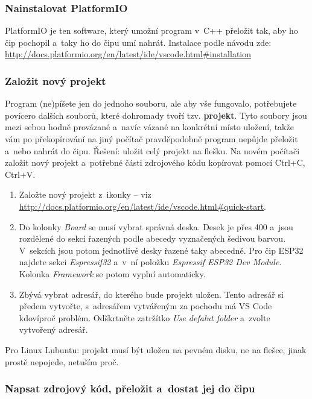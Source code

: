 \subsubsection{Nainstalovat PlatformIO} \label{platformio}

 PlatformIO je ten software, který umožní program v~C++ 
přeložit tak, aby ho čip pochopil a~taky ho do čipu umí nahrát. 
Instalace podle návodu zde: \url{http://docs.platformio.org/en/latest/ide/vscode.html\#installation}

\label{vsc:newproject} \subsubsection{Založit nový projekt}

Program (ne)píšete jen do jednoho souboru, ale aby vše fungovalo, potřebujete povícero dalších souborů, které dohromady tvoří tzv. {\bf projekt}.
Tyto soubory jsou mezi sebou hodně provázané a~navíc vázané na konkrétní místo uložení, 
takže vám po překopírování na jiný počítač pravděpodobně program nepůjde přeložit a~nebo 
nahrát do čipu. Řešení: uložit celý projekt na flešku. 
Na novém počítači založit nový projekt a~potřebné části zdrojového kódu kopírovat pomocí Ctrl+C, Ctrl+V. 

\begin{enumerate}
\item  Založte nový projekt z~ikonky  -- viz \url{http://docs.platformio.org/en/latest/ide/vscode.html\#quick-start}.
\item  Do kolonky {\it Board} se musí vybrat správná deska.
Desek je přes 400 a~jsou rozdělené do sekcí řazených podle abecedy vyznačených šedivou barvou.
V~sekcích jsou potom jednotlivé desky řazené taky abecedně.
Pro čip ESP32 najdete sekci {\it Espressif32} a~v~ní položku {\it Espressif ESP32 Dev Module}.
Kolonka {\it Framework } se potom vyplní automaticky. 
\item  Zbývá vybrat adresář, do kterého bude projekt uložen.
Tento adresář si předem vytvořte, s~adresářem vytvářeným za pochodu má VS Code kdovíproč problém.
Odškrtněte zatržítko {\it Use defalut folder} a~zvolte vytvořený adresář.  
\end{enumerate}

Pro Linux Lubuntu: projekt musí být uložen na pevném disku, ne na flešce, jinak prostě nepojede, netuším proč.  

\subsubsection{Napsat zdrojový kód, přeložit a~dostat jej do čipu}

